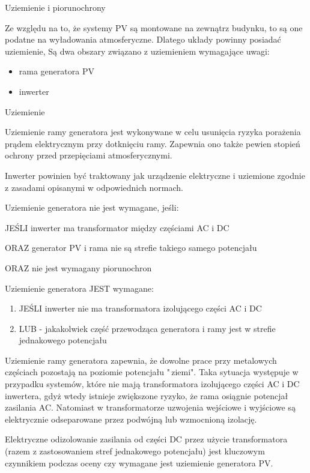 \documentclass[12pt,a4paper]{article}
\begin{document}
 

Uziemienie i piorunochrony 

Ze względu na to, że systemy PV są montowane na zewnątrz budynku, to są 
one podatne na wyładowania atmosferyczne. Dlatego układy powinny 
posiadać uziemienie, Są dwa obszary związano z uziemieniem wymagające 
uwagi: 

\begin{itemize}
\item rama generatora PV 
\item inwerter 
\end{itemize}
Uziemienie 

Uziemienie ramy generatora jest wykonywane w celu usunięcia ryzyka 
porażenia prądem elektrycznym przy dotknięciu ramy. Zapewnia ono także 
pewien stopień ochrony przed przepięciami atmosferycznymi. 

Inwerter powinien być traktowany jak urządzenie elektryczne i uziemione 
zgodnie z zasadami opisanymi w odpowiednich normach. 

 

Uziemienie generatora nie jest wymagane, jeśli: 

JEŚLI inwerter ma transformator między częściami AC i DC 

ORAZ generator PV i rama nie są strefie takiego samego potencjału 

ORAZ nie jest wymagany piorunochron 

 

Uziemienie generatora JEST wymagane: 

\begin{enumerate}
\item JEŚLI inwerter nie ma transformatora izolującego części AC i DC 
\item LUB - jakakolwiek część przewodząca generatora i ramy jest w 
strefie jednakowego potencjału 
\end{enumerate}
 

Uziemienie ramy generatora zapewnia, że dowolne prace przy metalowych 
częściach pozostają na poziomie potencjału "\,ziemi". Taka sytuacja 
występuje w przypadku systemów, które nie mają transformatora 
izolującego części AC i DC inwertera, gdyż wtedy istnieje zwiększone 
ryzyko, że rama osiągnie potencjał zasilania AC. Natomiast w 
transformatorze uzwojenia wejściowe i wyjściowe są elektrycznie 
odseparowane przez podwójną lub wzmocnioną izolację. 

 

Elektryczne odizolowanie zasilania od części DC przez użycie 
transformatora (razem z zastosowaniem stref jednakowego potencjału) jest 
kluczowym czynnikiem podczas oceny czy wymagane jest uziemienie 
generatora PV. 
\end{document}
